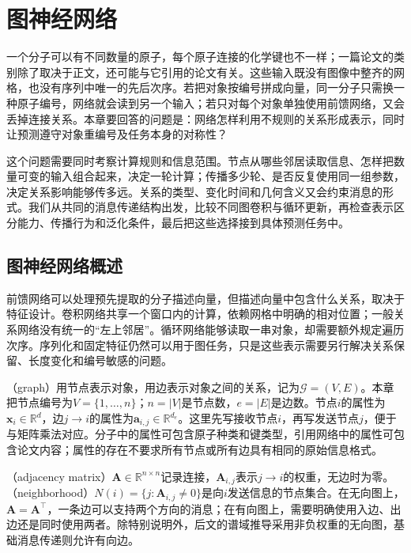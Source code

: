 \chapter{图神经网络}
\label{chap:graph-networks}

一个分子可以有不同数量的原子，每个原子连接的化学键也不一样；一篇论文的类别除了取决于正文，还可能与它引用的论文有关。这些输入既没有图像中整齐的网格，也没有序列中唯一的先后次序。若把对象按编号拼成向量，同一分子只需换一种原子编号，网络就会读到另一个输入；若只对每个对象单独使用前馈网络，又会丢掉连接关系。本章要回答的问题是：网络怎样利用不规则的关系形成表示，同时让预测遵守对象重编号及任务本身的对称性？

这个问题需要同时考察计算规则和信息范围。节点从哪些邻居读取信息、怎样把数量可变的输入组合起来，决定一轮计算；传播多少轮、是否反复使用同一组参数，决定关系影响能够传多远。关系的类型、变化时间和几何含义又会约束消息的形式。我们从共同的消息传递结构出发，比较不同图卷积与循环更新，再检查表示区分能力、传播行为和泛化条件，最后把这些选择接到具体预测任务中。

\section{图神经网络概述}
\label{sec:gnn-overview}

前馈网络可以处理预先提取的分子描述向量，但描述向量中包含什么关系，取决于特征设计。卷积网络共享一个窗口内的计算，依赖网格中明确的相对位置；一般关系网络没有统一的“左上邻居”。循环网络能够读取一串对象，却需要额外规定遍历次序。序列化和固定特征仍然可以用于图任务，只是这些表示需要另行解决关系保留、长度变化和编号敏感的问题。

（graph）用节点表示对象，用边表示对象之间的关系，记为$\mathcal{G}=(V,E)$。本章把节点编号为$V=\{1,\ldots,n\}$；$n=|V|$是节点数，$e=|E|$是边数。节点$i$的属性为$\bm{x}_i\in\mathbb{R}^{d}$，边$j\to i$的属性为$\bm{a}_{i,j}\in\mathbb{R}^{d_e}$。这里先写接收节点$i$，再写发送节点$j$，便于与矩阵乘法对应。分子中的属性可包含原子种类和键类型，引用网络中的属性可包含论文内容；属性的存在不要求所有节点或所有边具有相同的原始信息格式。

（adjacency matrix）$\bm{A}\in\mathbb{R}^{n\times n}$记录连接，$\bm{A}_{i,j}$表示$j\to i$的权重，无边时为零。（neighborhood）$N(i)=\{j:\bm{A}_{i,j}\ne0\}$是向$i$发送信息的节点集合。在无向图上，$\bm{A}=\bm{A}^{\top}$，一条边可以支持两个方向的消息；在有向图上，需要明确使用入边、出边还是同时使用两者。除特别说明外，后文的谱域推导采用非负权重的无向图，基础消息传递则允许有向边。

